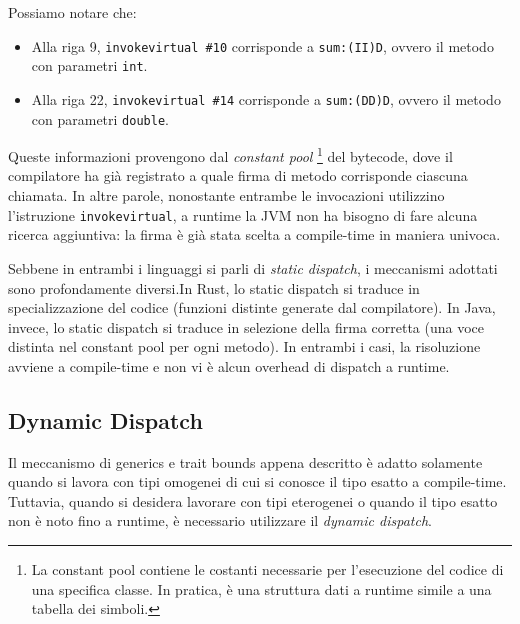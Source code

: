 Possiamo notare che:
\begin{itemize}
    \item Alla riga 9, \texttt{invokevirtual \#10} corrisponde a \texttt{sum:(II)D}, ovvero il metodo con parametri \texttt{int}.
    \item Alla riga 22, \texttt{invokevirtual \#14} corrisponde a \texttt{sum:(DD)D}, ovvero il metodo con parametri \texttt{double}.
\end{itemize}

Queste informazioni provengono dal \textit{constant pool} \footnote{La constant pool contiene le costanti necessarie per l'esecuzione del codice di una specifica classe. In pratica, è una struttura dati a runtime simile a una tabella dei simboli.} del bytecode, dove il compilatore ha già registrato a quale firma di metodo corrisponde ciascuna chiamata. In altre parole, nonostante entrambe le invocazioni utilizzino l'istruzione \texttt{invokevirtual}, a runtime la JVM non ha bisogno di fare alcuna ricerca aggiuntiva: la firma è già stata scelta a compile-time in maniera univoca.

Sebbene in entrambi i linguaggi si parli di \textit{static dispatch}, i meccanismi adottati sono profondamente diversi.In Rust, lo static dispatch si traduce in specializzazione del codice (funzioni distinte generate dal compilatore). In Java, invece, lo static dispatch si traduce in selezione della firma corretta (una voce distinta nel constant pool per ogni metodo). In entrambi i casi, la risoluzione avviene a compile-time e non vi è alcun overhead di dispatch a runtime. 
\subsection{Dynamic Dispatch}
Il meccanismo di generics e trait bounds appena descritto è adatto solamente quando si lavora con tipi omogenei di cui si conosce  il tipo esatto a compile-time. Tuttavia, quando si desidera lavorare con tipi eterogenei o quando il tipo esatto non è noto fino a runtime, è necessario utilizzare il \textit{dynamic dispatch}. 

